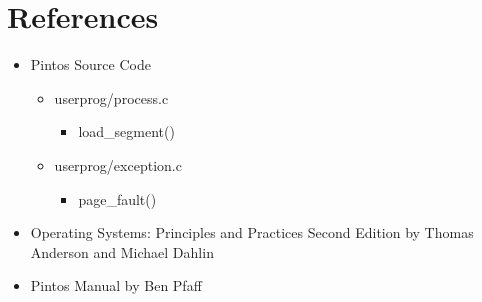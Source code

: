 \documentclass[11pt, letterpaper]{article}
\begin{document}
\pagebreak

\section*{References}
	
\begin{itemize}
\item Pintos Source Code
	\begin{itemize}
	\item userprog/process.c
	\begin{itemize}
		\item load\_segment()	
	\end{itemize}
	\item userprog/exception.c
	\begin{itemize}
		\item page\_fault()
	\end{itemize}
	\end{itemize}
\item Operating Systems: Principles and Practices Second Edition by Thomas Anderson and Michael Dahlin
\item Pintos Manual by Ben Pfaff
\end{itemize}
\end{document}
